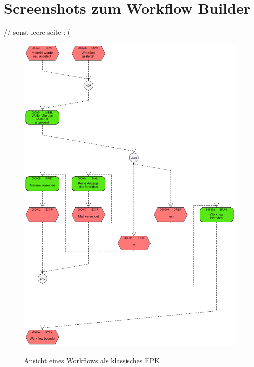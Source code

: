 \section{Screenshots zum Workflow Builder}
\vspace{-10pt} // sonst leere seite :-(
\begin{figure}[H]
	\begin{center}
	\includegraphics[height=0.9\textheight]{grafiken/wf-builder_view-classicepc.png}
	\caption{Ansicht eines Workflows als klassisches EPK}
	\vspace{-10pt}
	\label{abb:workflow-view-classicepc}
	\end{center}
\end{figure}

